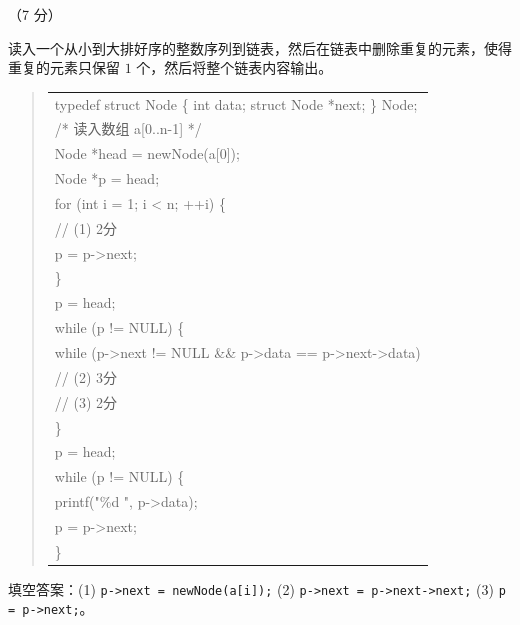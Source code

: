 \begin{question}[链表去重]（7 分）

读入一个从小到大排好序的整数序列到链表，然后在链表中删除重复的元素，使得重复的元素只保留 $1$ 个，然后将整个链表内容输出。

\begin{quote}
\footnotesize
\begin{tabular}{@{}l@{}}
typedef struct Node \{ int data; struct Node *next; \} Node;\\
/* 读入数组 a[0..n-1] */\\
Node *head = newNode(a[0]);\\
Node *p = head;\\
for (int i = 1; i < n; ++i) \{\\
\underline{\hspace{12em}} // (1) 2分\\
    p = p->next;\\
\}\\
p = head;\\
while (p != NULL) \{\\
    while (p->next != NULL \&\& p->data == p->next->data)\\
\underline{\hspace{12em}} // (2) 3分\\
\underline{\hspace{12em}} // (3) 2分\\
\}\\
p = head;\\
while (p != NULL) \{\\
    printf("\%d ", p->data);\\
    p = p->next;\\
\}\end{tabular}
\end{quote}

\begin{solution}
填空答案：(1) \texttt{p->next = newNode(a[i]);} (2) \texttt{p->next = p->next->next;} (3) \texttt{p = p->next;}。
\end{solution}
\end{question}

